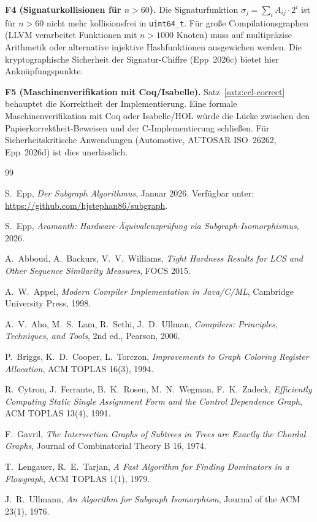 ﻿\documentclass[a4paper,12pt]{article}
\theoremstyle{definition}
\begin{document}
\textbf{F4 (Signaturkollisionen für $n > 60$).}
Die Signaturfunktion $\sigma_j = \sum_i A_{ij} \cdot 2^i$ ist für
$n > 60$ nicht mehr kollisionsfrei in \texttt{uint64\_t}. Für
große Compilationsgraphen (LLVM verarbeitet Funktionen mit
$n > 1000$ Knoten) muss auf multipräzise Arithmetik oder alternative
injektive Hashfunktionen ausgewichen werden. Die kryptographische
Sicherheit der Signatur-Chiffre (Epp~2026c) bietet hier
Anknüpfungspunkte.

\textbf{F5 (Maschinenverifikation mit Coq/Isabelle).}
Satz~\ref{satz:ccl-correct} behauptet die Korrektheit der
Implementierung. Eine formale Maschinenverifikation mit Coq oder
Isabelle/HOL würde die Lücke zwischen den Papierkorrektheit-Beweisen
und der C-Implementierung schließen. Für Sicherheitskritische
Anwendungen (Automotive, AUTOSAR ISO~26262, Epp~2026d) ist dies
unerlässlich.


\begin{thebibliography}{99}

S.~Epp, \textit{Der Subgraph Algorithmus}, Januar 2026. Verfügbar unter: \url{https://github.com/hjstephan86/subgraph}.

S.~Epp, \textit{Aramanth: Hardware-Äquivalenzprüfung via Subgraph-Isomorphismus}, 2026.

A.~Abboud, A.~Backurs, V.~V.~Williams, \textit{Tight Hardness Results for LCS and Other Sequence Similarity Measures}, FOCS 2015.

A.~W.~Appel, \textit{Modern Compiler Implementation in Java/C/ML}, Cambridge University Press, 1998.

A.~V.~Aho, M.~S.~Lam, R.~Sethi, J.~D.~Ullman, \textit{Compilers: Principles, Techniques, and Tools}, 2nd ed., Pearson, 2006.

P.~Briggs, K.~D.~Cooper, L.~Torczon, \textit{Improvements to Graph Coloring Register Allocation}, ACM TOPLAS 16(3), 1994.

R.~Cytron, J.~Ferrante, B.~K.~Rosen, M.~N.~Wegman, F.~K.~Zadeck, \textit{Efficiently Computing Static Single Assignment Form and the Control Dependence Graph}, ACM TOPLAS 13(4), 1991.

F.~Gavril, \textit{The Intersection Graphs of Subtrees in Trees are Exactly the Chordal Graphs}, Journal of Combinatorial Theory B 16, 1974.

T.~Lengauer, R.~E.~Tarjan, \textit{A Fast Algorithm for Finding Dominators in a Flowgraph}, ACM TOPLAS 1(1), 1979.

J.~R.~Ullmann, \textit{An Algorithm for Subgraph Isomorphism}, Journal of the ACM 23(1), 1976.

\end{thebibliography}
\end{document}
